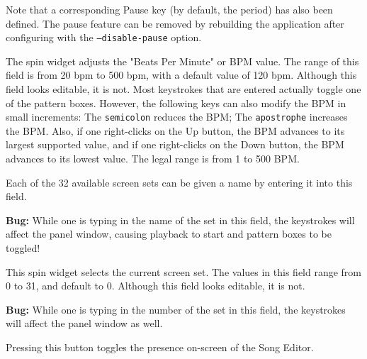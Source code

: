    Note that a corresponding Pause key (by default, the period) has also been
   defined.  The pause feature can be removed by rebuilding the application
   after configuring with the \texttt{--disable-pause} option.

   The spin widget adjusts the "Beats Per Minute" or BPM value.  The
   range of this field is from 20 bpm to 500 bpm, with a default value of
   120 bpm.
   Although this field looks editable, it is not.  Most keystrokes
   that are entered actually toggle one of the pattern boxes.
   However, the following keys can also modify the BPM in small increments:
    The \texttt{semicolon} reduces the BPM;
    The \texttt{apostrophe} increases the BPM.
   Also, if one right-clicks on the Up button, the BPM advances to its largest
   supported value, and if one right-clicks on the Down button, the BPM
   advances to its lowest value.  The legal range is from 1 to 500 BPM.

   Each of the 32 available screen sets can be given a name by entering it
   into this field.

   \textbf{Bug:}
   While one is typing in the name of the set in this field, the keystrokes
   will affect the panel window, causing playback to start and pattern
   boxes to be toggled!

   This spin widget selects the current screen set.  The values in this
   field range from 0 to 31, and default to 0.
   Although this field looks editable, it is not.

   \textbf{Bug:}
   While one is typing in the number of the set in this field, the keystrokes
   will affect the panel window as well.

   Pressing this button toggles the presence on-screen of the Song
   Editor.

